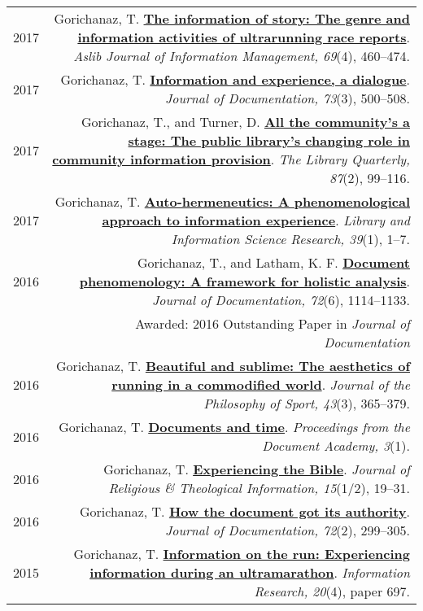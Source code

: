 \documentclass[letterpaper,11pt]{article}
\begin{document}
\begin{longtable}{ @{} L @{} R @{} }
2017&	Gorichanaz, T. \href{http://www.emeraldinsight.com/doi/full/10.1108/AJIM-03-2017-0071}{\textbf{The information of story: The genre and information activities of ultrarunning race reports}}. \emph{Aslib Journal of Information Management, 69}(4), 460--474.\\[1em]

2017&	Gorichanaz, T. \href{http://www.emeraldinsight.com/doi/full/10.1108/JD-09-2016-0114}{\textbf{Information and experience, a dialogue}}. \emph{Journal of Documentation, 73}(3), 500--508.\\[1em]

2017&	Gorichanaz, T., and Turner, D. \href{http://www.journals.uchicago.edu/doi/full/10.1086/690737}{\textbf{All the community’s a stage: The public library’s changing role in community information provision}}. \emph{The Library Quarterly, 87}(2), 99--116.\\[1em]

2017&	Gorichanaz, T. \href{http://doi.org/10.1016/j.lisr.2017.01.001}{\textbf{Auto-hermeneutics: A phenomenological approach to information experience}}. \emph{Library and Information Science Research, 39}(1), 1--7.\\[1em]

2016&	Gorichanaz, T., and Latham, K. F. \href{http://dx.doi.org/10.1108/JD-01-2016-0007}{\textbf{Document phenomenology: A framework for holistic analysis}}. \emph{Journal of Documentation, 72}(6), 1114--1133.\\
&		{\semibf Awarded}: 2016 Outstanding Paper in \emph{Journal of Documentation}\\[1em]

2016&	Gorichanaz, T. \href{http://www.tandfonline.com/doi/full/10.1080/00948705.2016.1206826}{\textbf{Beautiful and sublime: The aesthetics of running in a commodified world}}. \emph{Journal of the Philosophy of Sport, 43}(3), 365--379.\\[1em]

2016&	Gorichanaz, T. \href{http://ideaexchange.uakron.edu/docam/vol3/iss1/7/}{\textbf{Documents and time}}. \emph{Proceedings from the Document Academy, 3}(1).\\[1em]

2016&	Gorichanaz, T. \href{http://www.tandfonline.com/doi/full/10.1080/10477845.2016.1168278}{\textbf{Experiencing the Bible}}. \emph{Journal of Religious \& Theological Information, 15}(1/2), 19--31.\\[1em]

2016&	Gorichanaz, T. \href{http://www.emeraldinsight.com/doi/pdfplus/10.1108/JD-09-2015-0117}{\textbf{How the document got its authority}}. \emph{Journal of Documentation, 72}(2), 299--305.\\[1em]

2015&	Gorichanaz, T. \href{http://www.informationr.net/ir/20-4/paper697.html#.Weykl0zMw1h}{\textbf{Information on the run: Experiencing information during an ultramarathon}}. \emph{Information Research, 20}(4), paper 697.


\end{longtable}
\end{document}
